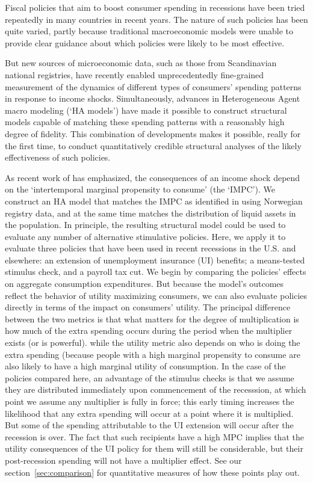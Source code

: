 \documentclass[../HAFiscal]{subfiles}
\begin{document}
Fiscal policies that aim to boost consumer spending in recessions have been tried repeatedly in many countries in recent years.  The nature of such policies has been quite varied, partly because traditional macroeconomic models were unable to provide clear guidance about which policies were likely to be most effective.

But new sources of microeconomic data, such as those from Scandinavian national registries, have recently enabled unprecedentedly fine-grained measurement of the dynamics of different types of consumers' spending patterns in response to income shocks.  Simultaneously, advances in Heterogeneous Agent macro modeling (`HA models') have made it possible to construct structural models capable of matching these spending patterns with a reasonably high degree of fidelity.  This combination of developments makes it possible, really for the first time, to conduct quantitatively credible structural analyses of the likely effectiveness of such policies.

    As recent work of \cite{auclert2018IKC} has emphasized, the consequences of an income shock depend on the `intertemporal marginal propensity to consume' (the `IMPC').  We construct an HA model that matches the IMPC as identified in \cite{fagereng_mpc_2021} using Norwegian registry data, and at the same time matches the distribution of liquid assets in the population.  In principle, the resulting structural model could be used to evaluate any number of alternative stimulative policies.  Here, we apply it to evaluate three policies that have been used in recent recessions in the U.S. and elsewhere: an extension of unemployment insurance (UI) benefits; a means-tested stimulus check, and a payroll tax cut.  We begin by comparing the policies' effects on aggregate consumption expenditures.  But because the model's outcomes reflect the behavior of utility maximizing consumers, we can also evaluate policies directly in terms of the impact on consumers' utility. The principal difference between the two metrics is that what matters for the degree of multiplication is how much of the extra spending occurs during the period when the multiplier exists (or is powerful). while the utility metric also depends on who is doing the extra spending (because people with a high marginal propensity to consume are also likely to have a high marginal utility of consumption.  In the case of the policies compared here, an advantage of the stimulus checks is that we assume they are distributed immediately upon commencement of the recesssion, at which point we assume any multiplier is fully in force; this early timing increases the likelihood that any extra spending will occur at a point where it is multiplied.  But some of the spending attributable to the UI extension will occur after the recession is over.  The fact that such recipients have a high MPC implies that the utility consequences of the UI policy for them will still be considerable, but their post-recession spending will not have a multiplier effect.  See our section~\ref{sec:comparison} for quantitative measures of how these points play out.
\end{document}
